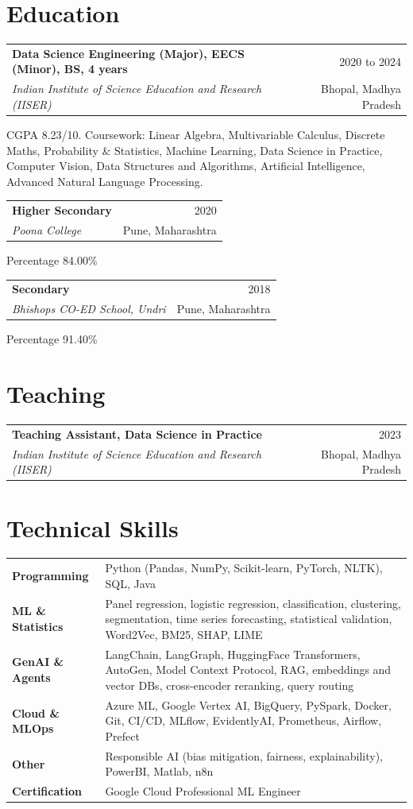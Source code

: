 \documentclass[11pt,a4paper]{article}
\makeatletter
\newcommand{\entry}[4]{%
  \begin{tabularx}{\linewidth}{@{}X r@{}}
    \textbf{#1} & {\color{soft}#2}\\
    \textit{#3} & {\color{soft}\small #4}
  \end{tabularx}\par}
\newcommand{\gap}{\vspace{0.5em}}
\makeatother
\begin{document}
\section{Education}
\entry{Data Science Engineering (Major), EECS (Minor), BS, 4 years}{2020 to 2024}{Indian Institute of Science Education and Research (IISER)}{Bhopal, Madhya Pradesh}
{\small CGPA 8.23/10. Coursework: Linear Algebra, Multivariable Calculus, Discrete Maths, Probability \& Statistics, Machine Learning, Data Science in Practice, Computer Vision, Data Structures and Algorithms, Artificial Intelligence, Advanced Natural Language Processing.\par}
\gap
\entry{Higher Secondary}{2020}{Poona College}{Pune, Maharashtra}
{\small Percentage 84.00\%\par}
\gap
\entry{Secondary}{2018}{Bhishops CO-ED School, Undri}{Pune, Maharashtra}
{\small Percentage 91.40\%\par}

\section{Teaching}
\entry{Teaching Assistant, Data Science in Practice}{2023}{Indian Institute of Science Education and Research (IISER)}{Bhopal, Madhya Pradesh}

\section{Technical Skills}
\begin{tabularx}{\linewidth}{@{}>{\bfseries}l X@{}}
  Programming     & Python (Pandas, NumPy, Scikit-learn, PyTorch, NLTK), SQL, Java \\[1pt]
  ML \& Statistics & Panel regression, logistic regression, classification, clustering, segmentation, time series forecasting, statistical validation, Word2Vec, BM25, SHAP, LIME \\[1pt]
  GenAI \& Agents & LangChain, LangGraph, HuggingFace Transformers, AutoGen, Model Context Protocol, RAG, embeddings and vector DBs, cross-encoder reranking, query routing \\[1pt]
  Cloud \& MLOps  & Azure ML, Google Vertex AI, BigQuery, PySpark, Docker, Git, CI/CD, MLflow, EvidentlyAI, Prometheus, Airflow, Prefect \\[1pt]
  Other           & Responsible AI (bias mitigation, fairness, explainability), PowerBI, Matlab, n8n \\[1pt]
  Certification   & Google Cloud Professional ML Engineer \\
\end{tabularx}
\end{document}
